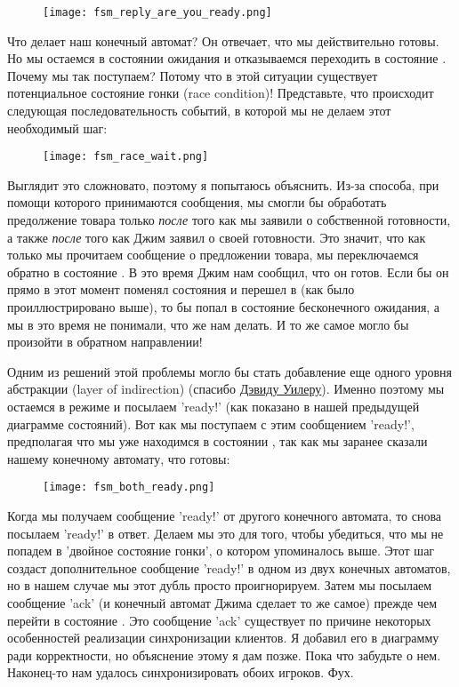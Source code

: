 \begin{figure}[H]
    \centering
    \texttt{[image: fsm\_reply\_are\_you\_ready.png]}
\end{figure}

Что делает наш конечный автомат?
Он отвечает, что мы действительно готовы.
Но мы остаемся в состоянии ожидания и отказываемся переходить в состояние .
Почему мы так поступаем?
Потому что в этой ситуации существует потенциальное состояние гонки (race condition)!
Представьте, что происходит следующая последовательность событий, в которой мы не делаем этот необходимый шаг:

\begin{figure}[H]
    \centering
    \texttt{[image: fsm\_race\_wait.png]}
\end{figure}

Выглядит это сложновато, поэтому я попытаюсь объяснить.
Из\--за способа, при помощи которого принимаются сообщения, мы смогли бы обработать предолжение товара только \emph{после} того как мы заявили о собственной готовности, а также \emph{после} того как Джим заявил о своей готовности.
Это значит, что как только мы прочитаем сообщение о предложении товара, мы переключаемся обратно в состояние .
В это время Джим нам сообщил, что он готов.
Если бы он прямо в этот момент поменял состояния и перешел в  (как было проиллюстрировано выше), то бы попал в состояние бесконечного ожидания, а мы в это время не понимали, что же нам делать.
И то же самое могло бы произойти в обратном направлении!

Одним из решений этой проблемы могло бы стать добавление еще одного уровня абстракции (layer of indirection) (спасибо \href{http://en.wikipedia.org/wiki/David\_Wheeler\_(computer\_scientist)}{Дэвиду Уилеру}).
Именно поэтому мы остаемся в режиме  и посылаем 'ready!' (как показано в нашей предыдущей диаграмме состояний).
Вот как мы поступаем с этим сообщением 'ready!', предполагая что мы уже находимся в состоянии , так как мы заранее сказали нашему конечному автомату, что готовы:

\begin{figure}[H]
    \centering
    \texttt{[image: fsm\_both\_ready.png]}
\end{figure}

Когда мы получаем сообщение 'ready!' от другого конечного автомата, то снова посылаем 'ready!' в ответ.
Делаем мы это для того, чтобы убедиться, что мы не попадем в 'двойное состояние гонки', о котором упоминалось выше.
Этот шаг создаст дополнительное сообщение 'ready!' в одном из двух конечных автоматов, но в нашем случае мы этот дубль просто проигнорируем.
Затем мы посылаем сообщение 'ack' (и конечный автомат Джима сделает то же самое) прежде чем перейти в состояние .
Это сообщение 'ack' существует по причине некоторых особенностей реализации синхронизации клиентов.
Я добавил его в диаграмму ради корректности, но объяснение этому я дам позже.
Пока что забудьте о нем.
Наконец\--то нам удалось синхронизировать обоих игроков.
Фух.

